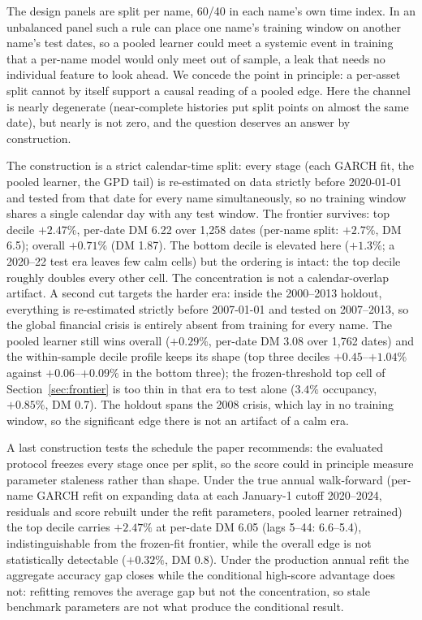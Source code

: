 \documentclass[11pt]{article}
\theoremstyle{remark}
\begin{document}
The design panels are split per name, 60/40 in each name's own time
index. In an unbalanced panel such a rule can place one name's
training window on another name's test dates, so a pooled learner
could meet a systemic event in training that a per-name model would only meet out of sample, a leak that needs no individual feature
to look ahead. We concede the point in principle: a per-asset split
cannot by itself support a causal reading of a pooled edge. Here the
channel is nearly degenerate (near-complete histories put split
points on almost the same date), but nearly is not zero, and the
question deserves an answer by construction.

The construction is a strict calendar-time split: every stage (each GARCH fit, the pooled learner, the GPD tail) is re-estimated on data strictly before 2020-01-01 and tested from that date for
every name simultaneously, so no training window shares a single
calendar day with any test window. The frontier survives: top decile
$+2.47\%$, per-date DM 6.22 over 1{,}258 dates (per-name split:
$+2.7\%$, DM 6.5); overall $+0.71\%$ (DM 1.87). The bottom decile is
elevated here ($+1.3\%$; a 2020--22 test era leaves few calm cells)
but the ordering is intact: the top decile roughly doubles every
other cell. The concentration is not a calendar-overlap artifact.
A second cut targets the harder era: inside the 2000--2013 holdout,
everything is re-estimated strictly before 2007-01-01 and tested on
2007--2013, so the global financial crisis is entirely absent from
training for every name. The pooled learner still wins overall
($+0.29\%$, per-date DM 3.08 over 1{,}762 dates) and the
within-sample decile profile keeps its shape (top three deciles
$+0.45$--$+1.04\%$ against $+0.06$--$+0.09\%$ in the bottom three);
the frozen-threshold top cell of Section~\ref{sec:frontier} is too
thin in that era to test alone ($3.4\%$ occupancy, $+0.85\%$, DM
0.7). The holdout spans the 2008 crisis, which lay in no training window,
so the significant edge there is not an artifact of a calm era.

A last construction tests the schedule the paper recommends: the
evaluated protocol freezes every stage once per split, so the score
could in principle measure parameter staleness rather than shape.
Under the true annual walk-forward (per-name GARCH refit on
expanding data at each January-1 cutoff 2020--2024, residuals and
score rebuilt under the refit parameters, pooled learner retrained) the top decile carries $+2.47\%$ at per-date DM 6.05 (lags 5--44:
6.6--5.4), indistinguishable from the frozen-fit frontier, while the
overall edge is not statistically detectable ($+0.32\%$, DM 0.8).
Under the production annual refit the aggregate accuracy gap closes
while the conditional high-score advantage does not: refitting removes
the average gap but not the concentration, so stale benchmark
parameters are not what produce the conditional result.
\end{document}
